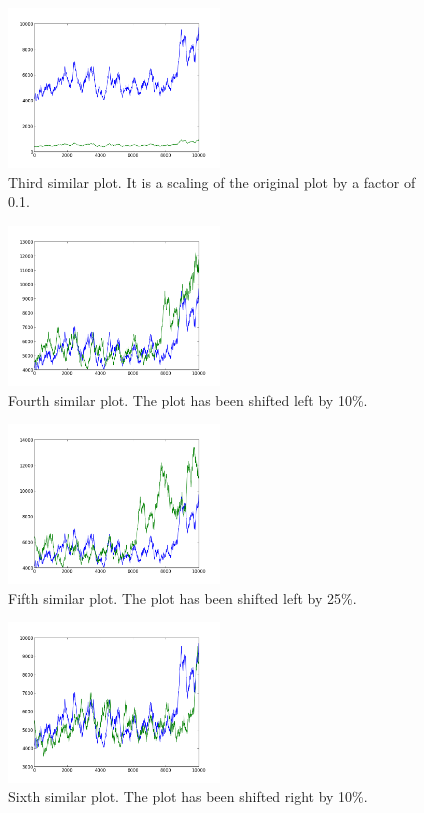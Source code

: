 \begin{figure}[h!]
    \centering
    \includegraphics[width=0.5\textwidth]{images/mutant_3.png}
    \caption{Third similar plot.  It is a scaling of the original plot by a factor of 0.1.}
    \label{fig:mutant_3}
\end{figure}

\begin{figure}[h!]
    \centering
    \includegraphics[width=0.5\textwidth]{images/mutant_4.png}
    \caption{Fourth similar plot.  The plot has been shifted left by 10\%.}
    \label{fig:mutant_4}
\end{figure}

\begin{figure}[h!]
    \centering
    \includegraphics[width=0.5\textwidth]{images/mutant_5.png}
    \caption{Fifth similar plot.  The plot has been shifted left by 25\%.}
    \label{fig:mutant_5}
\end{figure}

\begin{figure}[h!]
    \centering
    \includegraphics[width=0.5\textwidth]{images/mutant_6.png}
    \caption{Sixth similar plot.  The plot has been shifted right by 10\%.}
    \label{fig:mutant_6}
\end{figure}


